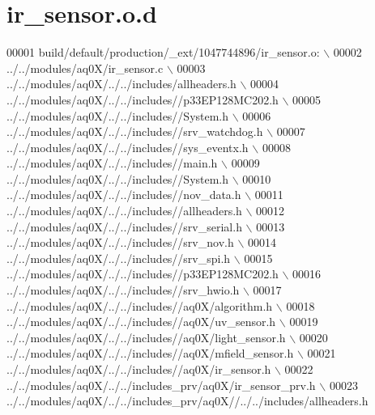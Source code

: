 \hypertarget{a00046_source}{\section{ir\+\_\+sensor.\+o.\+d}
\label{a00046_source}
}

\begin{DoxyCode}
00001 build/\textcolor{keywordflow}{default}/production/\_ext/1047744896/ir\_sensor.o:  \(\backslash\)
00002  ../../modules/aq0X/ir\_sensor.c  \(\backslash\)
00003 ../../modules/aq0X/../../includes/allheaders.h  \(\backslash\)
00004 ../../modules/aq0X/../../includes\textcolor{comment}{//p33EP128MC202.h  \(\backslash\)}
00005 \textcolor{comment}{../../modules/aq0X/../../includes//System.h  \(\backslash\)}
00006 \textcolor{comment}{../../modules/aq0X/../../includes//srv\_watchdog.h  \(\backslash\)}
00007 \textcolor{comment}{../../modules/aq0X/../../includes//sys\_eventx.h  \(\backslash\)}
00008 \textcolor{comment}{../../modules/aq0X/../../includes//main.h  \(\backslash\)}
00009 \textcolor{comment}{../../modules/aq0X/../../includes//System.h  \(\backslash\)}
00010 \textcolor{comment}{../../modules/aq0X/../../includes//nov\_data.h  \(\backslash\)}
00011 \textcolor{comment}{../../modules/aq0X/../../includes//allheaders.h  \(\backslash\)}
00012 \textcolor{comment}{../../modules/aq0X/../../includes//srv\_serial.h  \(\backslash\)}
00013 \textcolor{comment}{../../modules/aq0X/../../includes//srv\_nov.h  \(\backslash\)}
00014 \textcolor{comment}{../../modules/aq0X/../../includes//srv\_spi.h  \(\backslash\)}
00015 \textcolor{comment}{../../modules/aq0X/../../includes//p33EP128MC202.h  \(\backslash\)}
00016 \textcolor{comment}{../../modules/aq0X/../../includes//srv\_hwio.h  \(\backslash\)}
00017 \textcolor{comment}{../../modules/aq0X/../../includes//aq0X/algorithm.h  \(\backslash\)}
00018 \textcolor{comment}{../../modules/aq0X/../../includes//aq0X/uv\_sensor.h  \(\backslash\)}
00019 \textcolor{comment}{../../modules/aq0X/../../includes//aq0X/light\_sensor.h  \(\backslash\)}
00020 \textcolor{comment}{../../modules/aq0X/../../includes//aq0X/mfield\_sensor.h  \(\backslash\)}
00021 \textcolor{comment}{../../modules/aq0X/../../includes//aq0X/ir\_sensor.h  \(\backslash\)}
00022 \textcolor{comment}{../../modules/aq0X/../../includes\_prv/aq0X/ir\_sensor\_prv.h  \(\backslash\)}
00023 \textcolor{comment}{../../modules/aq0X/../../includes\_prv/aq0X//../../includes/allheaders.h }
\end{DoxyCode}
